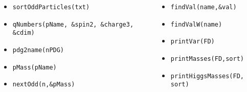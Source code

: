 \documentclass{beamer}
\begin{document}
\begin{frame}

\begin{columns}[onlytextwidth, T]
    \begin{column}{.47\textwidth}
        \begin{itemize}
            \item \texttt{sortOddParticles(txt)}
            \item \texttt{qNumbers(pName, \&spin2, \&charge3, \&cdim)}\footnotemark
            \item \texttt{pdg2name(nPDG)}
            \item \texttt{pMass(pName)}
            \item \texttt{nextOdd(n,\&pMass)}
        \end{itemize}
    \end{column}
    \begin{column}{.47\textwidth}
        \begin{itemize}
            \item \texttt{findVal(name,\&val)}
            \item \texttt{findValW(name)}
            \item \texttt{printVar(FD)}
            \item \texttt{printMasses(FD,sort)}
            \item \texttt{printHiggsMasses(FD, sort)}
        \end{itemize}
    \end{column}
\end{columns}

\end{frame}
\end{document}
